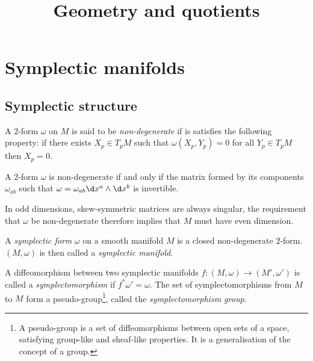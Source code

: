 \documentclass{worksheetclass}
\title{Geometry and quotients}
\begin{document}
\maketitle

\tableofcontents

\pagebreak

\section{Symplectic manifolds}

    \subsection{Symplectic structure}
    
        \begin{defn}
            A $2$-form $\omega$ on $M$ is said to be \emph{non-degenerate} if is satisfies the following property: if there exists $X_p\in T_pM$ such that $\omega(X_p,Y_p)=0$ for all $Y_p\in T_pM$ then $X_p=0$.
        \end{defn}
        
        \begin{prop}
            A $2$-form $\omega$ is non-degenerate if and only if the matrix formed by its components $\omega_{ab}$ such that $\omega=\omega_{ab}\d x^a\wedge\d x^b$ is invertible.
        \end{prop}
        
        In odd dimensions, skew-symmetric matrices are always singular, the requirement that $\omega$ be non-degenerate therefore implies that $M$ must have even dimension.
    
        \begin{defn}
            A \emph{symplectic form} $\omega$ on a smooth manifold $M$ is a closed non-degenerate $2$-form. $(M,\omega)$ is then called a \emph{symplectic manifold}.
        \end{defn}
        \begin{defn}
            A diffeomorphism between two symplectic manifolds $f:(M,\omega)\to(M',\omega')$ is called a \emph{symplectomorphism} if $f^*\omega' = \omega$. The set of symplectomorphisms from $M$ to $M$ form a pseudo-group\footnote{A pseudo-group is a set of diffeomorphisms between open sets of a space, satisfying group-like and sheaf-like properties. It is a generalisation of the concept of a group.}, called the \emph{symplectomorphism group}.
        \end{defn}
\end{document}
